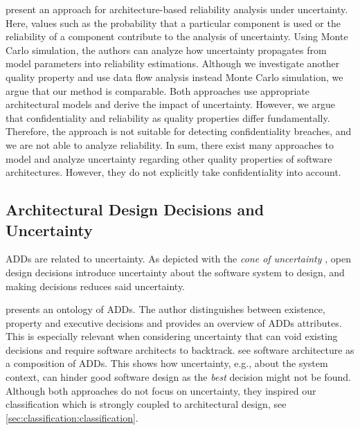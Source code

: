 \textcite{goseva-popstojanova_assessing_2003} present an approach for architecture-based reliability analysis under uncertainty.
Here, values such as the probability that a particular component is used or the reliability of a component contribute to the analysis of uncertainty.
Using Monte Carlo simulation, the authors can analyze how uncertainty propagates from model parameters into reliability estimations.
Although we investigate another quality property and use data flow analysis instead Monte Carlo simulation, we argue that our method is comparable.
Both approaches use appropriate architectural models and derive the impact of uncertainty.
However, we argue that confidentiality and reliability as quality properties differ fundamentally.
Therefore, the approach is not suitable for detecting confidentiality breaches, and we are not able to analyze reliability.
In sum, there exist many approaches to model and analyze uncertainty regarding other quality properties of software architectures. 
However, they do not explicitly take confidentiality into account.


\subsection{Architectural Design Decisions and Uncertainty}
\acfp{ADD} are related to uncertainty.
As depicted with the \emph{cone of uncertainty} \cite{mcconnell_software_1998}, open design decisions introduce uncertainty about the software system to design, and making decisions reduces said uncertainty.

\textcite{kruchten_ontology_2004} presents an ontology of \acp{ADD}.
The author distinguishes between existence, property and executive decisions and provides an overview of \acp{ADD} attributes.
This is especially relevant when considering uncertainty that can void existing decisions and require software architects to backtrack.
\textcite{jansen_software_2005} see software architecture as a composition of \acp{ADD}.
This shows how uncertainty, e.g., about the system context, can hinder good software design as the \emph{best} decision might not be found.
Although both approaches do not focus on uncertainty, they inspired our classification which is strongly coupled to architectural design, see \autoref{sec:classification:classification}.

